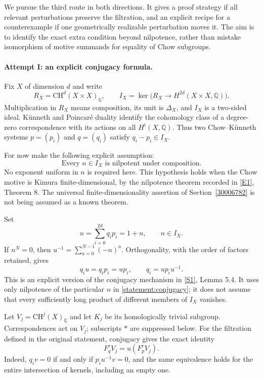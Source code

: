 \documentclass[11pt]{article}
\newcommand{\Q}{\mathbb{Q}}
\newcommand{\sref}[2]{\hyperlink{source:#1:#2}{[S#2]}}
\newcommand{\eref}[2]{\hyperlink{extra:#1:#2}{[E#2]}}
\begin{document}
We pursue the third route in both directions.  It gives a proof strategy if
all relevant perturbations preserve the filtration, and an explicit recipe
for a counterexample if one geometrically realizable perturbation moves it.
The aim is to identify the exact extra condition beyond nilpotence, rather
than mistake isomorphism of motive summands for equality of Chow subgroups.

\paragraph{Attempt I: an explicit conjugacy formula.}
Fix $X$ of dimension $d$ and write
\[
 R_X=\mathrm{CH}^d(X\times X)_{\Q},\qquad
 I_X=\ker\bigl(R_X\longrightarrow H^{2d}(X\times X,\Q)\bigr).
\]
Multiplication in $R_X$ means composition, its unit is $\Delta_X$, and $I_X$
is a two-sided ideal.  K\"unneth and Poincar\'e duality identify the cohomology
class of a degree-zero correspondence with its actions on all $H^i(X,\Q)$.
Thus two Chow--K\"unneth systems $p=(p_i)$ and $q=(q_i)$ satisfy
$q_i-p_i\in I_X$.

For now make the following explicit assumption:
\begin{equation}\label{statement:nil}
 \text{Every $n\in I_X$ is nilpotent under composition.}
\end{equation}
No exponent uniform in $n$ is required here.  This hypothesis holds when the
Chow motive is Kimura finite-dimensional, by the nilpotence theorem recorded
in \eref{statement}{1}, Theorem 8.  The universal finite-dimensionality assertion of
Section~\ref{30006782} is not being assumed as a known theorem.

Set
\begin{equation}\label{statement:conjugacy}
 u=\sum_{i=0}^{2d}q_i p_i=1+n,\qquad n\in I_X.
\end{equation}
If $n^N=0$, then $u^{-1}=\sum_{a=0}^{N-1}(-n)^a$.  Orthogonality, with the
order of factors retained, gives
\[
 q_i u=q_i p_i=u p_i,
 \qquad q_i=u p_i u^{-1}.
\]
This is an explicit version of the conjugacy mechanism in
\sref{statement}{1}, Lemma 5.4.  It uses only nilpotence of the particular $n$ in
\eqref{statement:conjugacy}; it does not assume that every sufficiently long
product of different members of $I_X$ vanishes.

Let $V_j=\mathrm{CH}^j(X)_{\Q}$ and let $K_j$ be its homologically trivial
subgroup.  Correspondences act on $V_j$; subscripts $*$ are suppressed below.
For the filtration defined in the original statement, conjugacy gives the
exact identity
\begin{equation}\label{statement:transport}
 F_q^r V_j=u(F_p^r V_j).
\end{equation}
Indeed, $q_i v=0$ if and only if $p_i u^{-1}v=0$, and the same equivalence
holds for the entire intersection of kernels, including an empty one.
\end{document}
